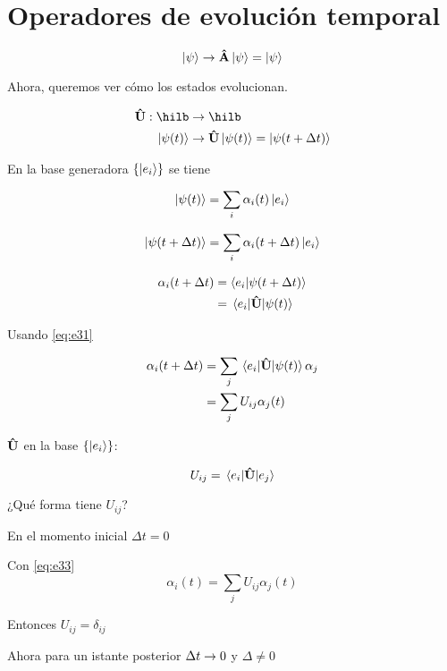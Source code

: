 \section{Operadores de evolución temporal}
\[
\ket{\psi}\rightarrow\vu{A}\ket{\psi}=\ket{\psi}
\]

Ahora, queremos ver cómo los estados evolucionan.

\begin{definition}
\begin{align*}
    \vu{U}:\hilb&\then\hilb \\
    \ket{\psi(t)}&\then\vu{U}\ket{\psi(t)}=\ket{\psi(t+\Delta t)}\\
\end{align*}

\end{definition}

En la base generadora $\qty{\ket{e_i}}$ se tiene

\begin{equation}
    \ket{\psi(t)}=\sum_i\alpha_i(t)\ket{e_i}
    \label{eq:e31}
\end{equation}

\begin{equation}
\centering
    \ket{\psi(t+\Delta t)}=\sum_i\alpha_i(t+\Delta t)\ket{e_i}
    \label{eq:e32}
\end{equation}

\begin{align*}
    \alpha_i(t+\Delta t)&=\bra{e_i}\ket{\psi(t+\Delta t)}\\
    &=\mel{e_i}{\vu{U}}{\psi(t)}
\end{align*}

Usando \autoref{eq:e31}

\begin{align}
    \alpha_i(t+\Delta t)&=\sum_j \mel{e_i}{\vu{U}}{\psi(t)}\alpha_j\\
    &=\sum_j U_{ij}\alpha_j(t)
    \label{eq:e33}
\end{align}

$\vu{U}$ en la base $\qty{\ket{e_i}}$:

\[
    U_{ij}=\mel{e_i}{\vu{U}}{e_j}
\]

¿Qué forma tiene $U_{ij}$?

En el momento inicial $\Delta t=0$

Con \autoref{eq:e33}
\[
    \alpha_i(t)=\sum_j U_{ij}\alpha_j(t)
\]

Entonces $U_{ij}=\delta_{ij}$

Ahora para un istante posterior $\Delta t\rightarrow 0$ y $\Delta\not=0$

